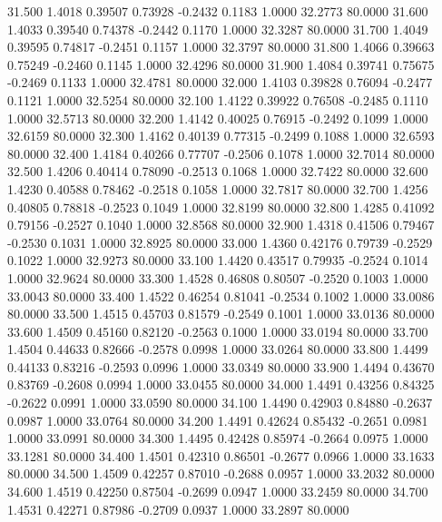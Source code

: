   31.500   1.4018   0.39507   0.73928  -0.2432   0.1183   1.0000  32.2773  80.0000
  31.600   1.4033   0.39540   0.74378  -0.2442   0.1170   1.0000  32.3287  80.0000
  31.700   1.4049   0.39595   0.74817  -0.2451   0.1157   1.0000  32.3797  80.0000
  31.800   1.4066   0.39663   0.75249  -0.2460   0.1145   1.0000  32.4296  80.0000
  31.900   1.4084   0.39741   0.75675  -0.2469   0.1133   1.0000  32.4781  80.0000
  32.000   1.4103   0.39828   0.76094  -0.2477   0.1121   1.0000  32.5254  80.0000
  32.100   1.4122   0.39922   0.76508  -0.2485   0.1110   1.0000  32.5713  80.0000
  32.200   1.4142   0.40025   0.76915  -0.2492   0.1099   1.0000  32.6159  80.0000
  32.300   1.4162   0.40139   0.77315  -0.2499   0.1088   1.0000  32.6593  80.0000
  32.400   1.4184   0.40266   0.77707  -0.2506   0.1078   1.0000  32.7014  80.0000
  32.500   1.4206   0.40414   0.78090  -0.2513   0.1068   1.0000  32.7422  80.0000
  32.600   1.4230   0.40588   0.78462  -0.2518   0.1058   1.0000  32.7817  80.0000
  32.700   1.4256   0.40805   0.78818  -0.2523   0.1049   1.0000  32.8199  80.0000
  32.800   1.4285   0.41092   0.79156  -0.2527   0.1040   1.0000  32.8568  80.0000
  32.900   1.4318   0.41506   0.79467  -0.2530   0.1031   1.0000  32.8925  80.0000
  33.000   1.4360   0.42176   0.79739  -0.2529   0.1022   1.0000  32.9273  80.0000
  33.100   1.4420   0.43517   0.79935  -0.2524   0.1014   1.0000  32.9624  80.0000
  33.300   1.4528   0.46808   0.80507  -0.2520   0.1003   1.0000  33.0043  80.0000
  33.400   1.4522   0.46254   0.81041  -0.2534   0.1002   1.0000  33.0086  80.0000
  33.500   1.4515   0.45703   0.81579  -0.2549   0.1001   1.0000  33.0136  80.0000
  33.600   1.4509   0.45160   0.82120  -0.2563   0.1000   1.0000  33.0194  80.0000
  33.700   1.4504   0.44633   0.82666  -0.2578   0.0998   1.0000  33.0264  80.0000
  33.800   1.4499   0.44133   0.83216  -0.2593   0.0996   1.0000  33.0349  80.0000
  33.900   1.4494   0.43670   0.83769  -0.2608   0.0994   1.0000  33.0455  80.0000
  34.000   1.4491   0.43256   0.84325  -0.2622   0.0991   1.0000  33.0590  80.0000
  34.100   1.4490   0.42903   0.84880  -0.2637   0.0987   1.0000  33.0764  80.0000
  34.200   1.4491   0.42624   0.85432  -0.2651   0.0981   1.0000  33.0991  80.0000
  34.300   1.4495   0.42428   0.85974  -0.2664   0.0975   1.0000  33.1281  80.0000
  34.400   1.4501   0.42310   0.86501  -0.2677   0.0966   1.0000  33.1633  80.0000
  34.500   1.4509   0.42257   0.87010  -0.2688   0.0957   1.0000  33.2032  80.0000
  34.600   1.4519   0.42250   0.87504  -0.2699   0.0947   1.0000  33.2459  80.0000
  34.700   1.4531   0.42271   0.87986  -0.2709   0.0937   1.0000  33.2897  80.0000

